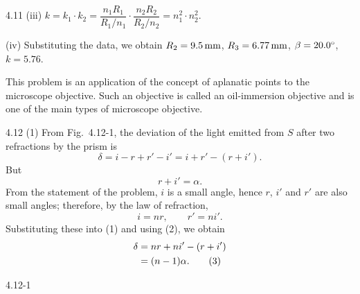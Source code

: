 \begin{solution}{4.11}
(iii) $k = k_1\cdot k_2 = \dfrac{n_1R_1}{R_1/n_1}\cdot\dfrac{n_2R_2}{R_2/n_2} = n_1^2\cdot n_2^2$.

(iv) Substituting the data, we obtain $R_2=9.5\,\mathrm{mm}$, $R_3=6.77\,\mathrm{mm}$,
$\beta=20.0^{\circ}$, $k=5.76$.

\begin{commentary}
This problem is an application of the concept of aplanatic points to the microscope objective. Such
an objective is called an oil-immersion objective and is one of the main types of microscope
objective.
\end{commentary}
\end{solution}

\begin{solution}{4.12}
(1) From Fig.~4.12-1, the deviation of the light emitted from $S$ after two refractions by the
prism is
\begin{equation}
\delta = i-r+r'-i' = i+r'-(r+i'). \tag{1}
\end{equation}
But
\begin{equation}
r+i' = \alpha. \tag{2}
\end{equation}
From the statement of the problem, $i$ is a small angle, hence $r$, $i'$ and $r'$ are also small
angles; therefore, by the law of refraction,
\begin{equation*}
i = nr,\qquad r' = ni'.
\end{equation*}
Substituting these into (1) and using (2), we obtain
\begin{align}
\delta &= nr+ni'-(r+i')\notag\\
&= (n-1)\alpha. \tag{3}
\end{align}

\begin{figbox}{4.12-1}
\end{figbox}


\end{solution}
